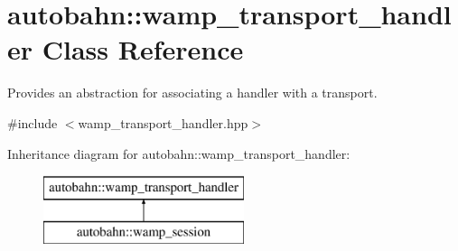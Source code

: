 \hypertarget{classautobahn_1_1wamp__transport__handler}{}\section{autobahn\+:\+:wamp\+\_\+transport\+\_\+handler Class Reference}
\label{classautobahn_1_1wamp__transport__handler}


Provides an abstraction for associating a handler with a transport.  




{\ttfamily \#include $<$wamp\+\_\+transport\+\_\+handler.\+hpp$>$}

Inheritance diagram for autobahn\+:\+:wamp\+\_\+transport\+\_\+handler\+:\begin{figure}[H]
\begin{center}
\leavevmode
\includegraphics[height=2.000000cm]{classautobahn_1_1wamp__transport__handler}
\end{center}
\end{figure}

